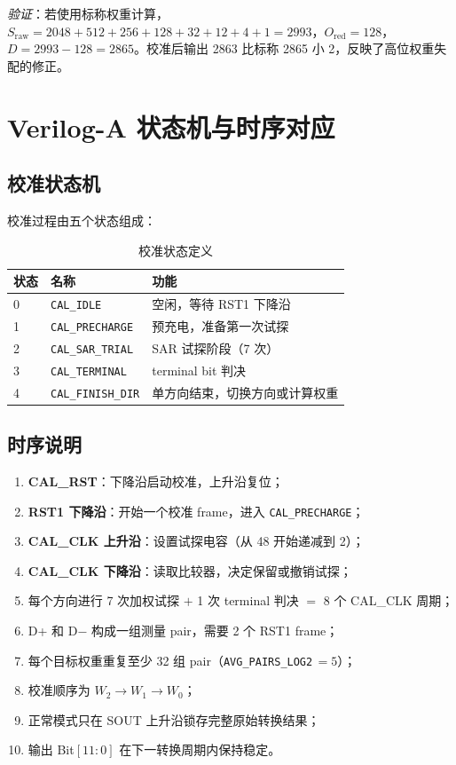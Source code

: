 \documentclass[
  UTF8,
  a4paper,
  11pt,
  oneside,
  fontset=fandol
]{ctexrep}
\newcommand{\code}[1]{\texttt{#1}}
\begin{document}
\textit{验证}：若使用标称权重计算，$S_{\mathrm{raw}} = 2048 + 512 + 256 + 128 + 32 + 12 + 4 + 1 = 2993$，$O_{\mathrm{red}} = 128$，$D = 2993 - 128 = 2865$。校准后输出 2863 比标称 2865 小 \SI{2}{\LSB}，反映了高位权重失配的修正。

\chapter{Verilog-A 状态机与时序对应}

\section{校准状态机}

校准过程由五个状态组成：

\begin{table}[H]
\centering
\caption{校准状态定义}
\label{tab:states}
\small
\begin{tabularx}{\textwidth}{l l X}
\toprule
状态 & 名称 & 功能 \\
\midrule
0 & \code{CAL\_IDLE} & 空闲，等待 RST1 下降沿 \\
1 & \code{CAL\_PRECHARGE} & 预充电，准备第一次试探 \\
2 & \code{CAL\_SAR\_TRIAL} & SAR 试探阶段（7 次） \\
3 & \code{CAL\_TERMINAL} & terminal bit 判决 \\
4 & \code{CAL\_FINISH\_DIR} & 单方向结束，切换方向或计算权重 \\
\bottomrule
\end{tabularx}
\end{table}

\section{时序说明}

\begin{enumerate}[leftmargin=2em]
    \item \textbf{CAL\_RST}：下降沿启动校准，上升沿复位；
    \item \textbf{RST1 下降沿}：开始一个校准 frame，进入 \code{CAL\_PRECHARGE}；
    \item \textbf{CAL\_CLK 上升沿}：设置试探电容（从 48 开始递减到 2）；
    \item \textbf{CAL\_CLK 下降沿}：读取比较器，决定保留或撤销试探；
    \item 每个方向进行 7 次加权试探 $+$ 1 次 terminal 判决 $=$ 8 个 CAL\_CLK 周期；
    \item D+ 和 D$-$ 构成一组测量 pair，需要 2 个 RST1 frame；
    \item 每个目标权重重复至少 32 组 pair（\code{AVG\_PAIRS\_LOG2}\,$=5$）；
    \item 校准顺序为 $W_2 \to W_1 \to W_0$；
    \item 正常模式只在 SOUT 上升沿锁存完整原始转换结果；
    \item 输出 Bit$[11:0]$ 在下一转换周期内保持稳定。
\end{enumerate}
\end{document}
